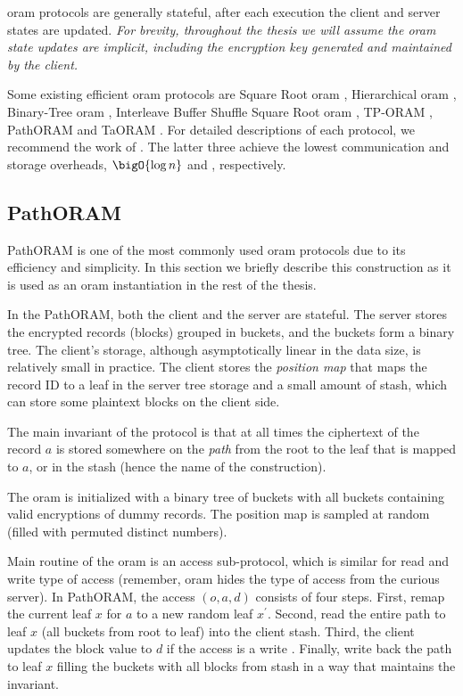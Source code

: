 		\acrshort{oram} protocols are generally stateful, after each execution the client and server states are updated.
		\emph{For brevity, throughout the thesis we will assume the \acrshort{oram} state updates are implicit, including the encryption key generated and maintained by the client.}

		Some existing efficient \acrshort{oram} protocols are Square Root \acrshort{oram} \cite{oram-theory}, Hierarchical \acrshort{oram} \cite{oram-original}, Binary-Tree \acrshort{oram} \cite{binary-tree-oram}, Interleave Buffer Shuffle Square Root \acrshort{oram} \cite{shortest-path-oram}, TP-ORAM \cite{tp-oram}, PathORAM \cite{path-oram} and TaORAM \cite{taostore}.
		For detailed descriptions of each protocol, we recommend the work of \textcite{oram-survey-feifei}.
		The latter three  achieve the lowest communication and storage overheads, $\bigO{\log \dataSize}$ and \bigO{\dataSize}, respectively.

		\subsection{PathORAM}

			PathORAM \cite{path-oram} is one of the most commonly used \acrshort{oram} protocols due to its efficiency and simplicity.
			In this section we briefly describe this construction as it is used as an \acrshort{oram} instantiation in the rest of the thesis.

			In the PathORAM, both the client \client{} and the server \server{} are stateful.
			The server stores the encrypted records (blocks) grouped in buckets, and the buckets form a binary tree.
			The client's storage, although asymptotically linear in the data size, is relatively small in practice.
			The client stores the \emph{position map} that maps the record ID to a leaf in the server tree storage and a small amount of stash, which can store some plaintext blocks on the client side.

			The main invariant of the protocol is that at all times the ciphertext of the record $a$ is stored somewhere on the \emph{path} from the root to the leaf that is mapped to $a$, or in the stash (hence the name of the construction).

			The \acrshort{oram} is initialized with a binary tree of buckets with all buckets containing valid encryptions of dummy records.
			The position map is sampled at random (filled with permuted distinct numbers).

			Main routine of the \acrshort{oram} is an access sub-protocol, which is similar for read \oramRead{} and write \oramWrite{} type of access (remember, \acrshort{oram} hides the type of access from the curious server).
			In PathORAM, the access $(o, a, d)$ consists of four steps.
			First, remap the current leaf $x$ for $a$ to a new random leaf $x^\prime$.
			Second, read the entire path to leaf $x$ (all buckets from root to leaf) into the client stash.
			Third, the client updates the block value to $d$ if the access is a write \oramWrite{}.
			Finally, write back the path to leaf $x$ filling the buckets with all blocks from stash in a way that maintains the invariant.

